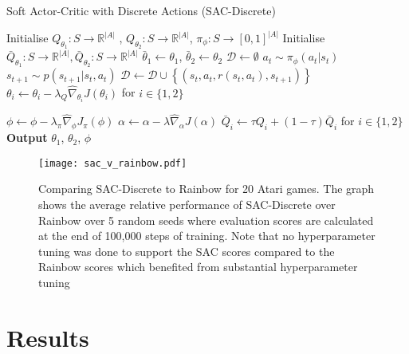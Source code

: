 \documentclass{article}
\begin{document}
\begin{algorithm}
\caption{Soft Actor-Critic with Discrete Actions (SAC-Discrete)}
\label{alg:soft_actor_critic}
\begin{algorithmic}
\State Initialise $Q_{\theta_1}: S \to \mathbb{R}^{|A|}$ , $Q_{\theta_2}: S \to \mathbb{R}^{|A|}$, $\pi_{\phi}: S \to [0, 1]^{|A|}$ 
\State Initialise $\bar Q_{\theta_1}: S \to \mathbb{R}^{|A|} , \bar Q_{\theta_2}: S \to \mathbb{R}^{|A|}$ 
\State $\bar \theta_1 \leftarrow \theta_1$, $\bar \theta_2 \leftarrow \theta_2$ 
\State $\mathcal{D}\leftarrow\emptyset$ 
	    \State $a_t \sim \pi_{\phi}(a_t|s_t)$ 
	    \State $s_{t+1} \sim p(s_{t+1}|s_t, a_t)$ 
	    \State $\mathcal{D} \leftarrow \mathcal{D} \cup \left\{(s_t, a_t, r(s_t, a_t), s_{t+1})\right\}$ 
	\EndFor
\State $\theta_i \leftarrow \theta_i - \lambda_Q \hat \nabla_{\theta_i} J(\theta_i)$ for $i \in \{1, 2\}$ 
	    
	    
	    \State $\phi \leftarrow \phi - \lambda_\pi \hat \nabla_\phi J_\pi(\phi)$
	    \State $\alpha \leftarrow \alpha - \lambda \hat \nabla_\alpha J(\alpha)$ 
	    \State $\bar Q_i \leftarrow \tau Q_i + (1-\tau)\bar Q_i$ for $i\in\{1,2\}$
	\EndFor
\EndFor
  \textbf{Output} 
 $\theta_1$, $\theta_2$, $\phi $
\end{algorithmic}
\end{algorithm}

\begin{figure}[h]
\centering
\texttt{[image: sac\_v\_rainbow.pdf]}
\caption{\label{fig:sac_vs_rainbow} Comparing SAC-Discrete to Rainbow for 20 Atari games. The graph shows the average relative performance of SAC-Discrete over Rainbow over 5 random seeds where evaluation scores are calculated at the end of 100,000 steps of training. Note that no hyperparameter tuning was done to support the SAC scores compared to the Rainbow scores which benefited from substantial hyperparameter tuning}
\end{figure}
\section{Results}
\end{document}
